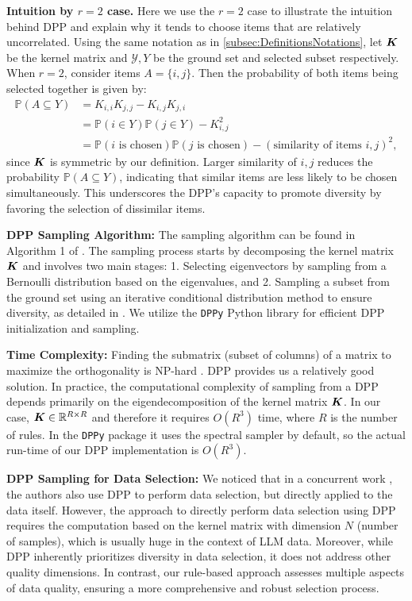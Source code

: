 \documentclass{article}
\begin{document}
\textbf{Intuition by $r=2$ case.} Here we use the $r=2$ case to illustrate the intuition behind DPP and explain why it tends to choose items that are relatively uncorrelated. Using the same notation as in \ref{subsec:DefinitionsNotations}, let ${\bm{K}}$ be the kernel matrix and $\mathcal{Y}, Y$ be the ground set and selected subset respectively. When $r=2$, consider items $A = \{i,j\}$. Then the probability of both items being selected together is given by:
\begin{align*}
    \mathbb{P}(A \subseteq  Y) 
    &= K_{i,i}K_{j,j} - K_{i,j}K_{j,i}\\
    &= \mathbb{P}(i \in Y)\mathbb{P}(j \in Y) - K_{i,j}^2\\
    &= \mathbb{P}(i\text{ is chosen})\mathbb{P}(j\text{ is chosen}) - (\text{similarity of items $i,j$})^2,
\end{align*}
since ${\bm{K}}$ is symmetric by our definition. Larger similarity of $i,j$ reduces the probability $\mathbb{P}(A \subseteq  Y)$, indicating that similar items are less likely to be chosen simultaneously. This underscores the DPP’s capacity to promote diversity by favoring the selection of dissimilar items.


\textbf{DPP Sampling Algorithm: } The sampling algorithm can be found in Algorithm 1 of \citet{kulesza2012determinantal}. The sampling process starts by decomposing the kernel matrix ${\bm{K}}$ and involves two main stages: 1. Selecting eigenvectors by sampling from a Bernoulli distribution based on the eigenvalues, and 2. Sampling a subset from the ground set using an iterative conditional distribution method to ensure diversity, as detailed in \citep{kulesza2012determinantal}. We utilize the \texttt{DPPy} Python library \citep{GPBV19} for efficient DPP initialization and sampling.

\textbf{Time Complexity:} Finding the submatrix (subset of columns) of a matrix to maximize the orthogonality is NP-hard \citep{civril2007finding, kulesza2012determinantal}. DPP provides us a relatively good solution. In practice, the computational complexity of sampling from a DPP depends primarily on the eigendecomposition of the kernel matrix ${\bm{K}}$. In our case, ${\bm{K}} \in \mathbb{R}^{R \times R}$ and therefore it requires $O(R^3)$ time, where $R$ is the number of rules. In the \texttt{DPPy} package \citep{GPBV19} it uses the spectral sampler by default, so the actual run-time of our DPP implementation is $O(R^3)$.

\textbf{DPP Sampling for Data Selection:} We noticed that in a concurrent work \cite{yang2024p3}, the authors also use DPP to perform data selection, but directly applied to the data itself. However, the approach to directly perform data selection using DPP requires the computation based on the kernel matrix with dimension $N$ (number of samples), which is usually huge in the context of LLM data. Moreover, while DPP inherently prioritizes diversity in data selection, it does not address other quality dimensions. In contrast, our rule-based approach assesses multiple aspects of data quality, ensuring a more comprehensive and robust selection process.
\end{document}
